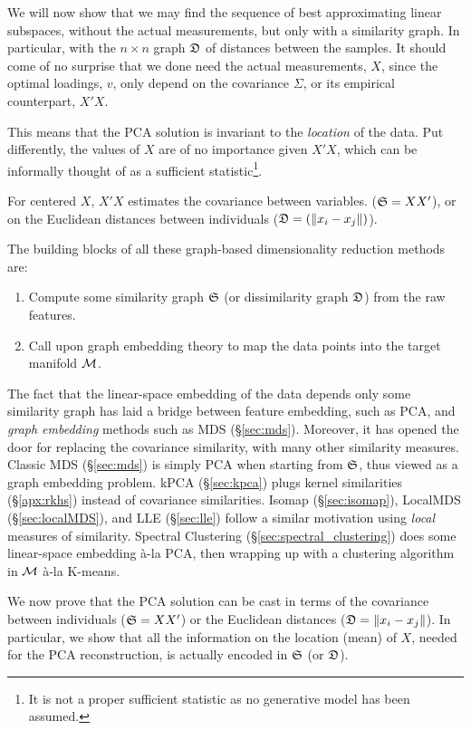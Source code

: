 \documentclass[12pt,a4paper]{article}
\begin{document}
We will now show that we may find the sequence of best approximating linear subspaces, without the actual measurements, but only with a similarity graph. 
In particular, with the $n\times n$ graph $\mathfrak{D}$ of distances between the samples. 
It should come of no surprise that we done need the actual measurements, $X$, since the optimal loadings, $v$, only depend on the covariance $\Sigma$, or its empirical counterpart, $X'X$. 

This means that the PCA solution is invariant to the \emph{location} of the data. 
Put differently, the values of $X$ are of no importance given $X'X$, which can be informally thought of as a sufficient statistic\footnote{It is not a proper sufficient statistic as no generative model has been assumed.}.  

For centered $X$, $X'X$ estimates the covariance between variables. 
 ($\mathfrak{S}=XX'$), or on the Euclidean distances between individuals ($\mathfrak{D}=(\Vert x_i-x_j \Vert)$).

The building blocks of all these graph-based dimensionality reduction methods are:
\begin{enumerate}
	\item Compute some similarity graph $\mathfrak{S}$ (or dissimilarity graph $\mathfrak{D}$) from the raw features.
	\item Call upon graph embedding theory to map the data points into the target manifold $\mathcal{M}$.
\end{enumerate}
The fact that the linear-space embedding of the data depends only some similarity graph has laid a bridge between feature embedding, such as PCA, and \emph{graph embedding} methods such as MDS (\S\ref{sec:mds}).
Moreover, it has opened the door for replacing the covariance similarity, with many other similarity measures. 
Classic MDS (\S\ref{sec:mds}) is simply PCA when starting from $\mathfrak{S}$, thus viewed as a graph embedding problem.
kPCA (\S\ref{sec:kpca}) plugs kernel similarities (\S\ref{apx:rkhs}) instead of covariance similarities. 
Isomap (\S\ref{sec:isomap}), LocalMDS (\S\ref{sec:localMDS}), and LLE (\S\ref{sec:lle}) follow a similar motivation using \emph{local} measures of similarity.
Spectral Clustering (\S\ref{sec:spectral_clustering}) does some linear-space embedding \`a-la PCA, then wrapping up with a clustering algorithm in $\mathcal{M}$ \`a-la K-means. 



We now prove that the PCA solution can be cast in terms of the covariance between individuals ($\mathfrak{S}=XX'$) or the Euclidean distances ($\mathfrak{D}=\Vert x_i-x_j \Vert$).
In particular, we show that all the information on the location (mean) of $X$, needed for the PCA reconstruction, is actually encoded in $\mathfrak{S}$ (or $\mathfrak{D}$).
\end{document}
